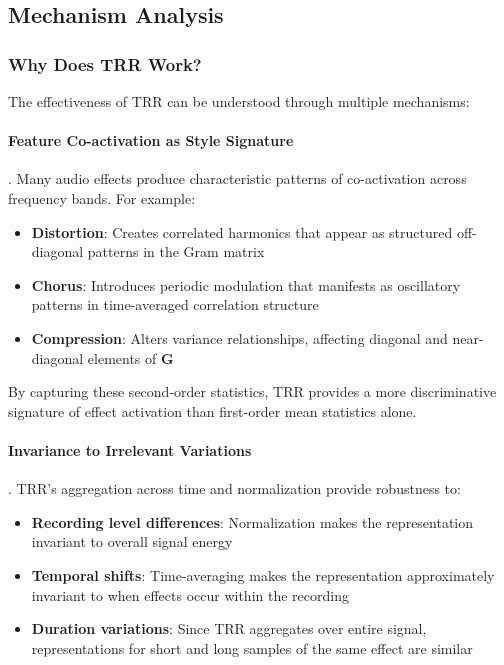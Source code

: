 
\subsection{Mechanism Analysis}

\subsubsection{Why Does TRR Work?}

The effectiveness of TRR can be understood through multiple mechanisms:

\paragraph{Feature Co-activation as Style Signature}. Many audio effects produce characteristic patterns of co-activation across frequency bands. For example:
\begin{itemize}
	\item \textbf{Distortion}: Creates correlated harmonics that appear as structured off-diagonal patterns in the Gram matrix
	\item \textbf{Chorus}: Introduces periodic modulation that manifests as oscillatory patterns in time-averaged correlation structure
	\item \textbf{Compression}: Alters variance relationships, affecting diagonal and near-diagonal elements of $\mathbf{G}$
\end{itemize}

By capturing these second-order statistics, TRR provides a more discriminative signature of effect activation than first-order mean statistics alone.

\paragraph{Invariance to Irrelevant Variations}. TRR's aggregation across time and normalization provide robustness to:
\begin{itemize}
	\item \textbf{Recording level differences}: Normalization makes the representation invariant to overall signal energy
	\item \textbf{Temporal shifts}: Time-averaging makes the representation approximately invariant to when effects occur within the recording
	\item \textbf{Duration variations}: Since TRR aggregates over entire signal, representations for short and long samples of the same effect are similar
\end{itemize}

